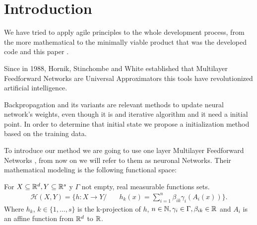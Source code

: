 \section*{Introduction} %

We have tried to apply agile principles to the whole development process, from
the more mathematical to the minimally viable product that was the developed
code and this paper \cite{DBLP:journals/corr/abs-2104-12545}.


Since in 1988, Hornik, Stinchombe and White established
that Multilayer Feedforward Networks are Universal Approximators \cite{HORNIK1989359} this tools have revolutionized artificial intelligence. 

Backpropagation \cite{backpropagation-Hinton} and its 
variants are relevant methods to update neural 
network's weights, even though it is and iterative 
algorithm and it need a initial point. In order to determine that initial state we propose a initialization method based on the training data. 

To introduce our method we are going to use one layer
 Multilayer Feedforward Networks \cite{HORNIK1989359} , from now on we will refer to them as neuronal Networks. Their mathematical modeling is the following functional space: 


    For $X \subseteq \mathbb{R}^d, Y \subseteq \mathbb{R}^s$ y  $\Gamma$ 
    not empty, real measurable functions sets.  
    \begin{align}
        \mathcal{H}(X,Y) 
        =
        \{
            h : X \longrightarrow Y 
            /& \quad 
            h_k(x) = 
            \sum_{i=1}^{n} \beta_{i k} \gamma_{i}( A_{i}(x))          
        \}.
    \end{align}
    Where $h_k$, $k \in \{1, \ldots, s\}$ is the k-projection of $h$, 
    $n \in \mathbb{N},\gamma_{i} \in \Gamma , \beta_{i k} \in \mathbb{R}$ and $A_{i}$ is an affine function from $\mathbb{R}^d$ to $\mathbb{R}$. 

